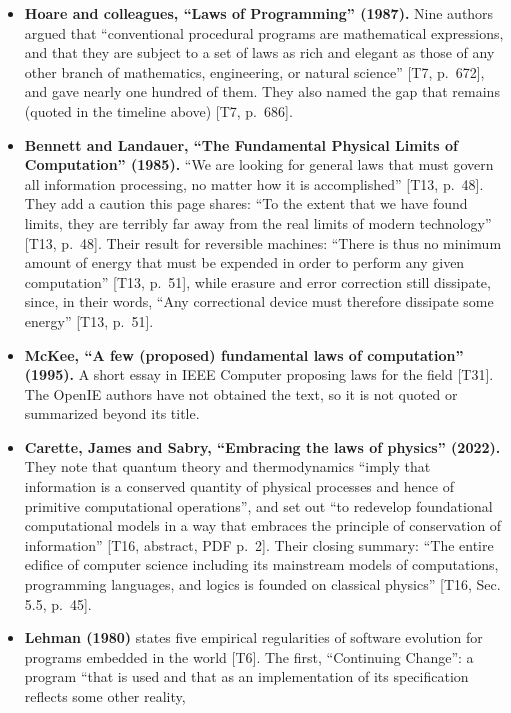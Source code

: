 \documentclass[10pt,letterpaper]{article}
\providecommand{\tightlist}{\setlength{\itemsep}{1pt}\setlength{\parskip}{0pt}}
\begin{document}
\begin{itemize}
\tightlist
\item
  \textbf{Hoare and colleagues, ``Laws of Programming'' (1987).} Nine
  authors argued that ``conventional procedural programs are
  mathematical expressions, and that they are subject to a set of laws
  as rich and elegant as those of any other branch of mathematics,
  engineering, or natural science'' {[}T7, p.~672{]}, and gave nearly
  one hundred of them. They also named the gap that remains (quoted in
  the timeline above) {[}T7, p.~686{]}.
\item
  \textbf{Bennett and Landauer, ``The Fundamental Physical Limits of
  Computation'' (1985).} ``We are looking for general laws that must
  govern all information processing, no matter how it is accomplished''
  {[}T13, p.~48{]}. They add a caution this page shares: ``To the extent
  that we have found limits, they are terribly far away from the real
  limits of modern technology'' {[}T13, p.~48{]}. Their result for
  reversible machines: ``There is thus no minimum amount of energy that
  must be expended in order to perform any given computation'' {[}T13,
  p.~51{]}, while erasure and error correction still dissipate, since,
  in their words, ``Any correctional device must therefore dissipate
  some energy'' {[}T13, p.~51{]}.
\item
  \textbf{McKee, ``A few (proposed) fundamental laws of computation''
  (1995).} A short essay in IEEE Computer proposing laws for the field
  {[}T31{]}. The OpenIE authors have not obtained the text, so it is not
  quoted or summarized beyond its title.
\item
  \textbf{Carette, James and Sabry, ``Embracing the laws of physics''
  (2022).} They note that quantum theory and thermodynamics ``imply that
  information is a conserved quantity of physical processes and hence of
  primitive computational operations'', and set out ``to redevelop
  foundational computational models in a way that embraces the principle
  of conservation of information'' {[}T16, abstract, PDF p.~2{]}. Their
  closing summary: ``The entire edifice of computer science including
  its mainstream models of computations, programming languages, and
  logics is founded on classical physics'' {[}T16, Sec. 5.5, p.~45{]}.
\item
  \textbf{Lehman (1980)} states five empirical regularities of software
  evolution for programs embedded in the world {[}T6{]}. The first,
  ``Continuing Change'': a program ``that is used and that as an
  implementation of its specification reflects some other reality,

\end{itemize}
\end{document}

